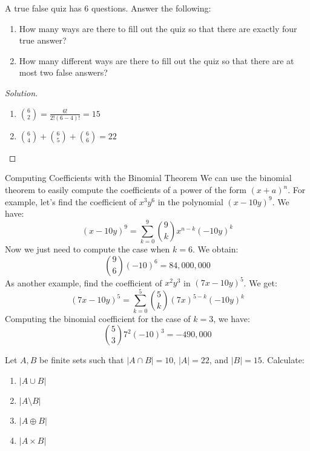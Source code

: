     \begin{problem}
    A true false quiz has $6$ questions. Answer the following:
    \begin{enumerate}
        \item How many ways are there to fill out the quiz so that there are exactly four true answer?
        \item How many different ways are there to fill out the quiz so that there are at most two false answers?
    \end{enumerate}
    \end{problem}
    \begin{proof}[Solution]
        \par
        \begin{enumerate}
            \item $\binom{6}{2} = \frac{6!}{2!(6-4)!}=15$
            \item $\binom{6}{4}+\binom{6}{5}+\binom{6}{6} = 22$
        \end{enumerate}
    \end{proof}
    \begin{lexample}{Computing Coefficients with the Binomial Theorem}{}
        We can use the binomial theorem to easily compute the coefficients of
        a power of the form $(x+a)^{n}$. For example, let's find the coefficient
        of $x^{3}y^{6}$ in the polynomial $(x-10y)^9$.
        We have:
        \begin{equation}
            (x-10y)^{9}=\sum_{k=0}^{9}\binom{9}{k}x^{n-k}(\minus{10}y)^{k}
        \end{equation}
        Now we just need to compute the case when $k=6$. We obtain:
        \begin{equation}
            \binom{9}{6}(\minus{10})^6=84,000,000
        \end{equation}
        As another example, find the coefficient of $x^{2}y^{3}$ in
        $(7x-10y)^{5}$. We get:
        \begin{equation}
            (7x-10y)^{5}=\sum_{k=0}^{5}\binom{5}{k}(7x)^{5-k}(\minus{10}y)^{k}
        \end{equation}
        Computing the binomial coefficient for the case of $k=3$, we have:
        \begin{equation}
            \binom{5}{3}7^{2}(\minus{10})^{3}=\minus{490,000}
        \end{equation}
    \end{lexample}
    \begin{problem}
    Let $A,B$ be finite sets such that $|A\cap B| =10$, $|A| = 22$, and $|B| = 15$. Calculate:
    \begin{enumerate}
        \item $|A\cup B|$
        \item $|A\setminus B|$
        \item $|A\oplus B|$
        \item $|A\times B|$
    \end{enumerate}
    \end{problem}
